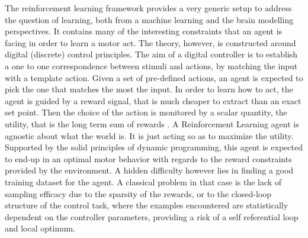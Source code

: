 \documentclass[runningheads]{llncs}
\begin{document}
The reinforcement learning framework \cite{sutton2018reinforcement} provides a very generic setup to address the question of learning, both from a machine learning and the brain modelling perspectives. It contains many of the interesting constraints that an agent is facing in order to learn a motor act.
The theory, however, is constructed around digital (discrete) control principles.
The aim of a digital controller is to establish a one to one correspondence between stimuli and actions, by
matching the input with a template action. 
Given a set of pre-defined actions, an agent is expected to pick the one that matches the most the input.  
In order to learn how to act, the agent is guided by a reward signal, that is much cheaper to extract than an exact set point.
Then the choice of the action is monitored by a scalar quantity, the utility, that is the long term sum of rewards \cite{sutton2018reinforcement}.
A Reinforcement Learning agent is agnostic about what the world is. It is just acting so as to maximize the utility.
Supported by the solid principles of dynamic programming, this agent is expected to end-up in an optimal motor behavior with regards to the reward constraints provided by the environment. 
A hidden difficulty however lies in finding a good training dataset for the agent. A classical problem in that case is the lack of sampling efficacy due to the sparsity of the rewards, or to the closed-loop structure of the control task, where the examples encountered are statistically dependent on the controller parameters, 
providing a risk of a self referential loop and local optimum.




\end{document}
